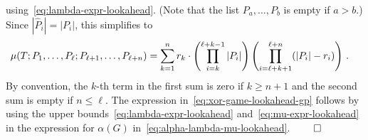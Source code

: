     using~\eqref{eq:lambda-expr-lookahead}. 
    (Note that the list $P_a, \ldots, P_b$ is empty if $a > b$.) 
    Since $|\hat{P}_i| = |P_i|$, this simplifies to 
    \begin{align}\label{eq:mu-expr-lookahead}
        \mu(T; P_1, \ldots, P_\ell; P_{\ell+1}, \ldots, P_{\ell+n})
        &=
            \sum_{k=1}^n r_k\cdot
                \left(  \prod_{i=k}^{\ell+k-1}     
                                                        |P_{i}|      \right)   
                \left(  \prod_{i=\ell+k+1}^{\ell+n}     
                                                        (|P_i| - r_i)
                                                                            \right)
        \,.
    \end{align}
    By convention, 
    the $k$-th term in the first sum is zero if $k \geq n + 1$ and
    the second sum is empty if $n \leq \ell$. 
    The expression in~\eqref{eq:xor-game-lookahead-gp} follows by 
    using the upper bounds~\eqref{eq:lambda-expr-lookahead} and~\eqref{eq:mu-expr-lookahead}
    in the expression for $\alpha(G)$ in~\eqref{eq:alpha-lambda-mu-lookahead}.
    \hfill$\qed$






